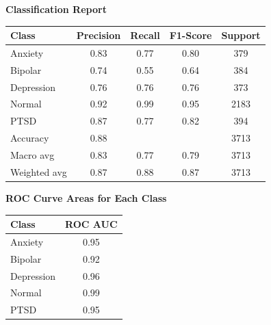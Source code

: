 \begin{center}
    \textbf{Classification Report} \\[0.5em]
    \begin{tabular}{|l|c|c|c|c|}
        \hline
        \textbf{Class}  & \textbf{Precision}  & \textbf{Recall} & \textbf{F1-Score} & \textbf{Support} \\ \hline
        Anxiety         & 0.83                & 0.77            & 0.80              & 379             \\ \hline
        Bipolar         & 0.74                & 0.55            & 0.64              & 384             \\ \hline
        Depression      & 0.76                & 0.76            & 0.76              & 373             \\ \hline
        Normal          & 0.92                & 0.99            & 0.95              & 2183            \\ \hline
        PTSD            & 0.87                & 0.77            & 0.82              & 394             \\ \hline
        Accuracy        & 0.88                &                 &                   & 3713            \\ \hline
        Macro avg       & 0.83                & 0.77            & 0.79              & 3713            \\ \hline
        Weighted avg    & 0.87                & 0.88            & 0.87              & 3713            \\ \hline
    \end{tabular}
\end{center}

\begin{center}
    \textbf{ROC Curve Areas for Each Class} \\[0.5em]
    \begin{tabular}{|l|c|}
        \hline
        \textbf{Class}  & \textbf{ROC AUC} \\ \hline
        Anxiety         & 0.95            \\ \hline
        Bipolar         & 0.92            \\ \hline
        Depression      & 0.96            \\ \hline
        Normal          & 0.99            \\ \hline
        PTSD            & 0.95            \\ \hline
    \end{tabular}
\end{center}

